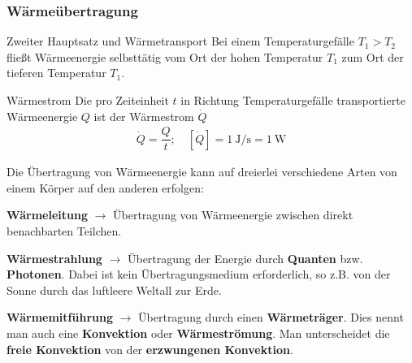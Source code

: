 \documentclass{beamer}
\begin{document}
{
  \frametitle{Wärmeübertragung}
  \begin{block}{Zweiter Hauptsatz und Wärmetransport}
  Bei einem Temperaturgefälle $T_1>T_2$ fließt Wärmeenergie selbsttätig vom Ort der hohen Temperatur $T_1$ zum Ort der tieferen Temperatur $T_1$.
  \end{block}
  
\begin{block}{Wärmestrom}
Die pro Zeiteinheit $t$ in Richtung Temperaturgefälle transportierte Wärmeenergie $Q$ ist der Wärmestrom $\dot{Q}$
\begin{align*}
\dot{Q}=\dfrac{Q}{t};\quad [\dot{Q}]=\SI{1}{\joule\per\second}=\SI{1}{\watt}
\end{align*}
\end{block}
Die Übertragung von Wärmeenergie kann auf dreierlei verschiedene Arten von einem Körper auf den anderen erfolgen:
  \begin{block}{\textbf{Wärmeleitung} $\rightarrow$}
  Übertragung von Wärmeenergie zwischen direkt benachbarten Teilchen.
  \end{block}
  \begin{block}{\textbf{Wärmestrahlung} $\rightarrow$}
  Übertragung der Energie durch \textbf{Quanten} bzw. \textbf{Photonen}. Dabei ist kein Übertragungsmedium erforderlich, so z.B. von der Sonne durch das luftleere Weltall zur Erde. 
  \end{block}
  \begin{block}{\textbf{Wärmemitführung} $\rightarrow$}
  Übertragung durch einen \textbf{Wärmeträger}. Dies nennt man auch eine \textbf{Konvektion} oder \textbf{Wärmeströmung}. Man unterscheidet die \textbf{freie Konvektion} von der \textbf{erzwungenen Konvektion}.
  \end{block}
}
\end{document}
